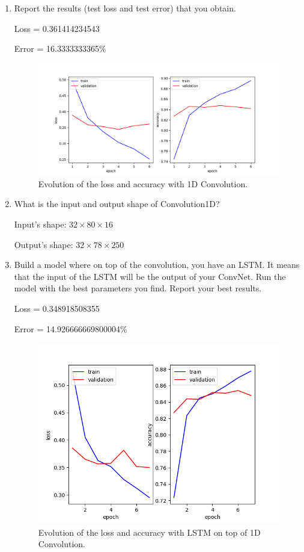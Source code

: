 \documentclass{article} %
\begin{document}
\begin{enumerate}
    \item
    Report the results (test loss and test error) that you obtain.

    Loss = 0.361414234543

    Error = 16.3333333365\%

    \begin{figure}[ht]
    \includegraphics[width=\textwidth,height=\textheight,keepaspectratio]{img/cnn_loss_acc.png}
    \caption{Evolution of the loss and accuracy with 1D Convolution.}
    \end{figure}

    \item
    What is the input and output shape of Convolution1D?

    Input's shape: $32 \times 80 \times 16$

    Output's shape: $32 \times 78 \times 250$

    \item
    Build a model where on top of the convolution, you have an LSTM. It means
    that the input of the LSTM will be the output of your ConvNet. Run the model
    with the best parameters you find. Report your best results.

    Loss = 0.348918508355

    Error = 14.926666669800004\%

    \begin{figure}[ht]
    \includegraphics[width=\textwidth,height=\textheight,keepaspectratio]{img/cnn_lstm_loss_acc.png}
    \caption{Evolution of the loss and accuracy with LSTM on top of 1D Convolution.}
    \end{figure}
\end{enumerate}
\end{document}
